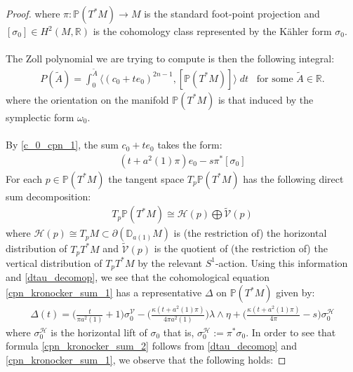 \documentclass[11pt]{amsart}
\theoremstyle{plain}
\theoremstyle{definition}
\theoremstyle{remark}
\begin{document}
\begin{proof}
where $\pi:\mathbb{P}(T^*M) \rightarrow M$ is the standard foot-point projection and $[\sigma_{0}] \in H^2(M,\mathbb{R})$ is the cohomology class represented by the K\"ahler form $\sigma_0$.\\
\\
The Zoll polynomial we are trying to compute is then the following integral:
\begin{align}\label{cpn_kronocker_sum_0}
    P(\tilde A) = \int^{\tilde A}_0  \langle (c_0+te_0)^{2n-1},[\mathbb{P}(T^*M)]\rangle\; dt \;\;\; \text{for some $\tilde A \in \mathbb{R}$.} 
        \end{align}
where the orientation on the manifold $\mathbb{P}(T^*M)$ is that induced by the symplectic form $\omega_0$.\\
\\
By \eqref{c_0_cpn_1}, the sum $c_0 + te_0$ takes the form: 
\begin{align}\label{cpn_kronocker_sum_1}
    (t+a^2(1)\pi)e_0 - {s}\pi^*[\sigma_{0}]
\end{align}
For each $p \in \mathbb{P}(T^*M)$ the tangent space $T_p\mathbb{P}(T^*M)$ has the following direct sum decomposition:
\begin{align}
    T_p\mathbb{P}(T^*M) \cong \mathcal{H}(p) \bigoplus \tilde{\mathcal{V}}(p)
\end{align}
where $\mathcal{H}(p) \cong T_pM \subset \partial(\mathbb{D}_{a(1)}M)$ is (the restriction of) the horizontal distribution of $T_pT^*M$ and $\tilde{\mathcal{V}}(p)$ is the quotient of (the restriction of) the vertical distribution of $T_pT^*M$ by the relevant $S^1$-action. Using this information and \eqref{dtau_decomop}, we see that the cohomological equation \eqref{cpn_kronocker_sum_1} has a representative $\Delta$ on $\mathbb{P}(T^*M)$ given by:
\begin{align}\label{cpn_kronocker_sum_2}
 \Delta(t) =  \Bigg(\frac{t}{\pi a^2(1)}+1\Bigg)\sigma^{\mathcal{V}}_{0} -\Bigg(\frac{\kappa(t+a^2(1)\pi)}{4\pi a^2(1)} \Bigg) \lambda\wedge \eta + \Bigg(\frac{\kappa(t+a^2(1)\pi)}{4\pi}-s \Bigg)\sigma^{\mathcal{H}}_0
\end{align}
where $\sigma^{\mathcal{H}}_{0}$ is the horizontal lift of $\sigma_{0}$ that is, $\sigma^{\mathcal{H}}_{0} := \pi^*\sigma_{0}$. In order to see that formula  \eqref{cpn_kronocker_sum_2} follows from \eqref{dtau_decomop} and \eqref{cpn_kronocker_sum_1}, we observe that the following holds:

\end{proof}
\end{document}
